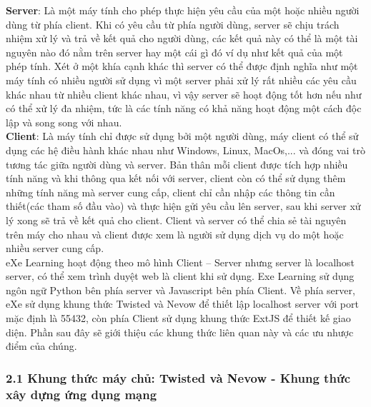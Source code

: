 \newpage

\textbf{Server}: Là một máy tính cho phép thực hiện yêu cầu của một hoặc nhiều người dùng từ phía client. Khi có yêu cầu từ phía người dùng, server sẽ chịu trách nhiệm xử lý và trả về kết quả cho người dùng, các kết quả này có thể là một tài nguyên nào đó nằm trên server hay một cái gì đó ví dụ như kết quả của một phép tính. Xét ở một khía cạnh khác thì server có thể được định nghĩa như một máy tính có nhiều người sử dụng vì một server phải xử lý rất nhiều các yêu cầu khác nhau từ nhiều client khác nhau, vì vậy server sẽ hoạt động tốt hơn nếu như có thể xử lý đa nhiệm, tức là các tính năng có khả năng hoạt động một cách độc lập và song song với nhau.\\

\textbf{Client}: Là máy tính chỉ được sử dụng bởi một người dùng, máy client có thể sử dụng các hệ điều hành khác nhau như Windows, Linux, MacOs,... và đóng vai trò tương tác giữa người dùng và server. Bản thân mỗi client được tích hợp nhiều tính năng và khi thông qua kết nối với server, client còn có thể sử dụng thêm những tính năng mà server cung cấp, client chỉ cần nhập các thông tin cần thiết(các tham số đầu vào) và thực hiện gửi yêu cầu lên server, sau khi server xử lý xong sẽ trả về kết quả cho client. Client và server có thể chia sẻ tài nguyên trên máy cho nhau và client được xem là người sử dụng dịch vụ do một hoặc nhiều server cung cấp.\\

eXe Learning hoạt động theo mô hình Client – Server nhưng server là localhost server, có thể xem trình duyệt web là client khi sử dụng. Exe Learning sử dụng ngôn ngữ Python bên phía server và Javascript bên phía Client. Về phía server, eXe sử dụng khung thức Twisted và Nevow để thiết lập localhost server với port mặc định là 55432, còn phía Client sử dụng khung thức ExtJS để thiết kế giao diện. Phần sau đây sẽ giới thiệu các khung thức liên quan này và các ưu nhược điểm của chúng.

\subsubsection{2.1 Khung thức máy chủ: Twisted và Nevow - Khung thức xây dựng ứng dụng mạng}

